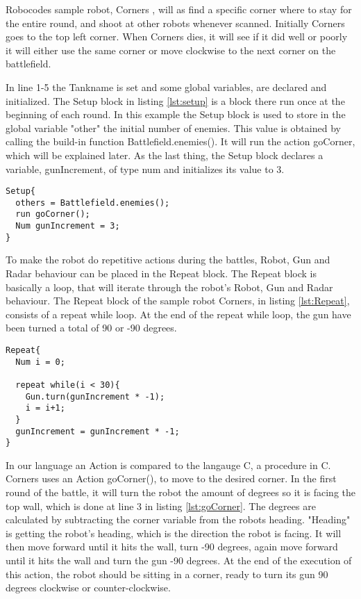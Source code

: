 Robocodes sample robot, Corners \cite{Corners}, will as find a specific corner where to stay for the entire round, and shoot at other robots whenever scanned. Initially Corners goes to the top left corner. When Corners dies, it will see if it did well or poorly it will either use the same corner or move clockwise to the next corner on the battlefield.

In line 1-5 the Tankname is set and some global variables, are declared and initialized. The Setup block in listing \ref{lst:setup} is a block there run once at the beginning of each round. In this example the Setup block is used to store in the global variable "other" the initial number of enemies. This value is obtained by calling the build-in function Battlefield.enemies(). It will run the action goCorner, which will be explained later. As the last thing, the Setup block declares a variable, gunIncrement, of type num and initializes its value to 3.

\begin{lstlisting}[caption={Code listing of the Setup block},  xleftmargin=.2\textwidth, label={lst:setup}]
Setup{
  others = Battlefield.enemies();  
  run goCorner();	 
  Num gunIncrement = 3;
}
\end{lstlisting}

To make the robot do repetitive actions during the battles, Robot, Gun and Radar behaviour can be placed in the Repeat block. The Repeat block is basically a loop, that will iterate through the robot's Robot, Gun and Radar behaviour. The Repeat block of the sample robot Corners, in listing \ref{lst:Repeat}, consists of a repeat while loop. At the end of the repeat while loop, the gun have been turned a total of 90 or -90 degrees. 

\begin{lstlisting}[caption={Code listing of the Repeat block}, xleftmargin=.2\textwidth, label={lst:Repeat}]
Repeat{  
  Num i = 0;
  
  repeat while(i < 30){
    Gun.turn(gunIncrement * -1);
    i = i+1;
  }  
  gunIncrement = gunIncrement * -1;
}
\end{lstlisting}

In our language an Action is compared to the langauge C, a procedure in C. Corners uses an Action goCorner(), to move to the desired corner. In the first round of the battle, it will turn the robot the amount of degrees so it is facing the top wall, which is done at line 3 in listing \ref{lst:goCorner}. The degrees are calculated by subtracting the corner variable from the robots heading. "Heading" is getting the robot's heading, which is the direction the robot is facing. It will then move forward until it hits the wall, turn -90 degrees, again  move forward until it hits the wall and turn the gun -90 degrees. At the end of the execution of this action, the robot should be sitting in a corner, ready to turn its gun 90 degrees clockwise or counter-clockwise.



